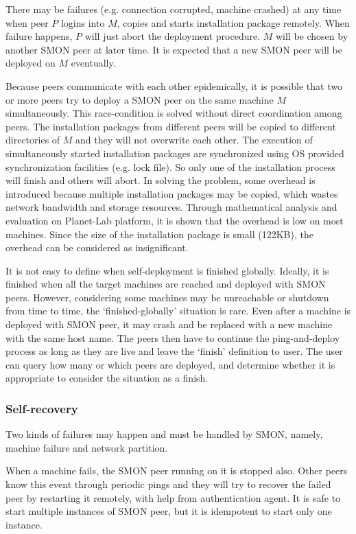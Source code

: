 There may be failures (e.g. connection corrupted, machine
crashed) at any time when peer $P$ logins
into $M$, copies and starts installation package remotely.
When failure happens, $P$ will just abort the deployment
procedure. $M$ will be chosen by another SMON peer at later
time. It is expected that a new SMON peer will be deployed
on $M$ eventually.

Because peers communicate with each other epidemically, it
is possible that two or more peers try to deploy a SMON peer
on the same machine $M$ simultaneously. This race-condition
is solved without direct coordination among peers. The
installation packages from different peers will be copied to
different directories of $M$ and they will not overwrite
each other. The execution of simultaneously started
installation packages are synchronized using OS provided
synchronization facilities (e.g. lock file). So only one of
the installation process will finish and others will abort.
In solving the problem, some overhead is introduced because
multiple installation packages may be copied, which wastes
network bandwidth and storage resources. Through
mathematical analysis and evaluation on Planet-Lab platform,
it is shown that the overhead is low on most machines. Since
the size of the installation package is small (122KB), the
overhead can be considered as insignificant.

It is not easy to define when self-deployment is finished
globally. Ideally, it is finished when all the target
machines are reached and deployed with SMON peers.  However,
considering some machines may be unreachable or shutdown
from time to time, the `finished-globally' situation is
rare. Even after a machine is deployed with SMON peer, it
may crash and be replaced with a new machine with the same
host name. The peers then have to continue the
ping-and-deploy process as long as they are live and leave
the `finish' definition to user. The user can query how many
or which peers are deployed, and determine whether it is
appropriate to consider the situation as a finish.

\subsubsection*{Self-recovery}

Two kinds of failures may happen and must be handled by
SMON, namely, machine failure and network partition.

When a machine fails, the SMON peer running on it is stopped
also. Other peers know this event through periodic pings and
they will try to recover the failed peer by restarting it
remotely, with help from authentication agent. It is safe to
start multiple instances of SMON peer, but it is idempotent
to start only one instance.

